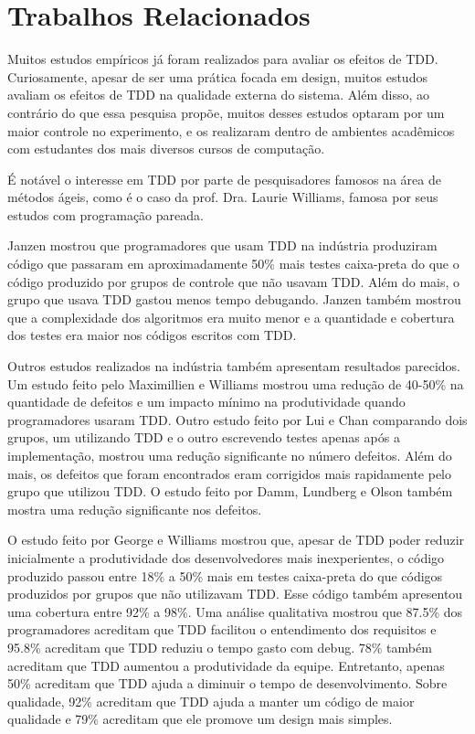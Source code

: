 \chapter{Trabalhos Relacionados}
\label{cap:trabalhos-relacionados}

Muitos estudos empíricos já foram realizados para avaliar os efeitos de TDD.
Curiosamente, apesar de ser uma prática focada em design, muitos estudos avaliam
os efeitos de TDD na qualidade externa do sistema. Além disso, ao
contrário do que essa pesquisa propõe, muitos desses estudos optaram por um
maior controle no experimento, e os realizaram dentro de ambientes acadêmicos 
com estudantes dos mais diversos cursos de computação.

É notável o interesse em TDD por parte de pesquisadores famosos na área de
métodos ágeis, como é o caso da prof. Dra. Laurie Williams, famosa por seus
estudos com programação pareada.

Janzen \cite{janzen-arch-improvement} mostrou que programadores que usam TDD na 
indústria produziram código que passaram em aproximadamente 50\% mais testes 
caixa-preta do que o código produzido por grupos de controle que não usavam TDD.
Além do mais, o grupo que usava TDD gastou menos tempo debugando. Janzen também 
mostrou que a complexidade dos algoritmos era muito menor e a quantidade e
cobertura dos testes era maior nos códigos escritos com TDD.

Outros estudos realizados na indústria também apresentam resultados parecidos.
Um estudo feito pelo Maximillien e Williams \cite{max-e-williams} mostrou uma
redução de 40-50\% na quantidade de defeitos e um impacto mínimo na
produtividade quando programadores usaram TDD. Outro estudo feito por Lui e
Chan \cite{lui-e-chan} comparando dois grupos, um utilizando TDD e o outro 
escrevendo testes apenas após a implementação, mostrou uma redução significante 
no número defeitos. Além do mais, os defeitos que foram encontrados eram 
corrigidos mais rapidamente pelo grupo que utilizou TDD. O estudo feito por 
Damm, Lundberg e Olson \cite{damn-lundberg-e-olson} também mostra uma redução
significante nos defeitos.

O estudo feito por George e Williams \cite{george-e-williams} mostrou que,
apesar de TDD poder reduzir inicialmente a produtividade dos desenvolvedores 
mais inexperientes, o código produzido passou entre 18\% a 50\% mais em testes 
caixa-preta do que códigos produzidos por grupos que não utilizavam TDD. Esse
código também apresentou uma cobertura entre 92\% a 98\%. Uma análise
qualitativa mostrou que 87.5\% dos programadores acreditam que TDD facilitou o 
entendimento dos requisitos e 95.8\% acreditam que TDD reduziu o tempo gasto com
debug. 78\% também acreditam que TDD aumentou a produtividade da equipe. 
Entretanto, apenas 50\% acreditam que TDD ajuda a diminuir o tempo de 
desenvolvimento. Sobre qualidade, 92\% acreditam que TDD ajuda a manter um
código de maior qualidade e 79\% acreditam que ele promove um design mais simples.

